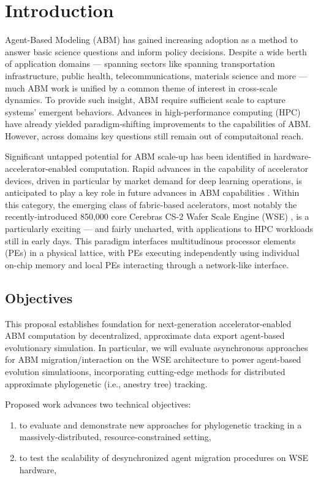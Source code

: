 \section{Introduction} \label{sec:introduction}

Agent-Based Modeling (ABM) has gained increasing adoption as a method to answer basic science questions and inform policy decisions.
Despite a wide berth of application domains --- spanning sectors like spanning transportation infrastructure, public health, telecommunications, materials science and more --- much ABM work is unified by a common theme of interest in cross-scale dynamics.
To provide such insight, ABM require sufficient scale to capture systems' emergent behaviors.
Advances in high-performance computing (HPC) have already yielded paradigm-shifting improvements to the capabilities of ABM. 
However, across domains key questions still remain out of computaitonal reach.

Significant untapped potential for ABM scale-up has been identified in hardware-accelerator-enabled computation.
Rapid advances in the capability of accelerator devices, driven in particular by market demand for deep learning operations, is anticipated to play a key role in future advances in ABM capabilities \citep{deptofenergyTODO}.
Within this category, the emerging class of fabric-based acelerators, most notably the recently-introduced 850,000 core Cerebras CS-2 Wafer Scale Engine (WSE) \citep{lauterbach2021path,lie2022cerebras}, is a particularly exciting --- and fairly uncharted, with applications to HPC workloads still in early days.
This paradigm interfaces multitudinous processor elements (PEs) in a physical lattice, with PEs executing independently using individual on-chip memory and local PEs interacting through a network-like interface.

\subsection{Objectives}

This proposal establishes foundation for next-generation accelerator-enabled ABM computation by  decentralized, approximate data export  agent-based evolutionary simulation.
In particular, we will evaluate asynchronous approaches for ABM migration/interaction on the WSE architecture to power agent-based evolution simulatioons, incorporating cutting-edge methods for distributed approximate phylogenetic (i.e., anestry tree) tracking.

Proposed work advances two technical objectives:
\begin{enumerate}
\item to evaluate and demonstrate new approaches for phylogenetic tracking in a massively-distributed, resource-constrained setting,
\item to test the scalability of desynchronized agent migration procedures on WSE hardware,
\end{enumerate}


